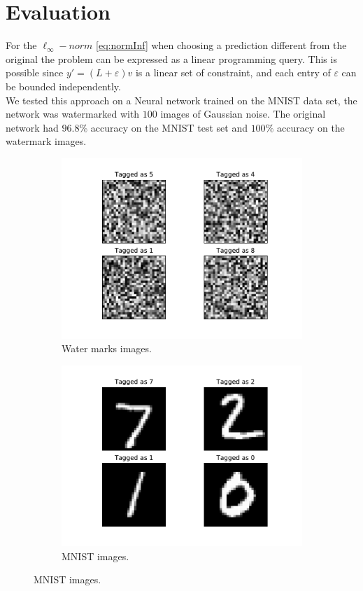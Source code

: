 \documentclass[a4paper]{llncs}
\begin{document}
\section{Evaluation}
\label{sec:evaluation}
For the $\ell_\infty-norm$ \ref{eq:normInf} when choosing a prediction different from the original the problem can be expressed as a linear programming query. This is possible since $y'=(L+\varepsilon)v$ is a linear set of constraint, and each entry of $\varepsilon$ can be bounded independently.
\\


We tested this approach on a Neural network trained on the MNIST data set, the network was watermarked with $100$ images of Gaussian noise. The original network had $96.8\text{\%}$ accuracy on the MNIST test set and $100\text{\%}$ accuracy on the watermark images.

\begin{figure}[h!]
  \centering
  \begin{subfigure}{0.4\linewidth}
    \includegraphics[width=\linewidth]{../data/wm.pdf}
     \caption{Water marks images.}
  \end{subfigure}
  \begin{subfigure}{0.4\linewidth}
    \includegraphics[width=\linewidth]{../data/mnist.pdf}
    \caption{MNIST images.}
  \end{subfigure}
  \label{fig:imageExamples}
\end{figure}
\end{document}
